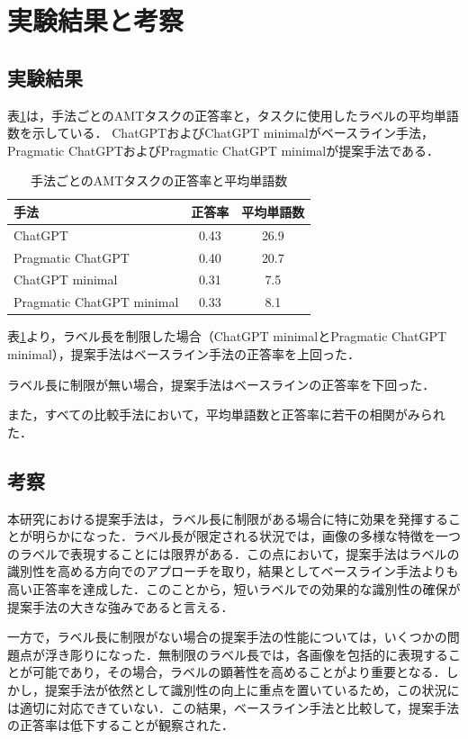 \documentclass[a4paper,11pt]{jreport}
\begin{document}
\section{実験結果と考察}

\subsection{実験結果}

表\ref{tab:accuracy_result}は，手法ごとのAMTタスクの正答率と，タスクに使用したラベルの平均単語数を示している．
ChatGPTおよびChatGPT minimalがベースライン手法，Pragmatic ChatGPTおよびPragmatic ChatGPT minimalが提案手法である．

\begin{table}[H]
\centering
\begin{tabular}{lcc}
\hline
手法 & 正答率 & 平均単語数 \\
\hline
ChatGPT & 0.43 & 26.9 \\
Pragmatic ChatGPT & 0.40 & 20.7 \\
ChatGPT minimal & 0.31 & 7.5 \\
Pragmatic ChatGPT minimal & 0.33 & 8.1 \\
\hline
\end{tabular}
\caption{手法ごとのAMTタスクの正答率と平均単語数}
\label{tab:accuracy_result}
\end{table}

表\ref{tab:accuracy_result}より，ラベル長を制限した場合（ChatGPT minimalとPragmatic ChatGPT minimal），提案手法はベースライン手法の正答率を上回った．

ラベル長に制限が無い場合，提案手法はベースラインの正答率を下回った．

また，すべての比較手法において，平均単語数と正答率に若干の相関がみられた．

\subsection{考察}
本研究における提案手法は，ラベル長に制限がある場合に特に効果を発揮することが明らかになった．ラベル長が限定される状況では，画像の多様な特徴を一つのラベルで表現することには限界がある．この点において，提案手法はラベルの識別性を高める方向でのアプローチを取り，結果としてベースライン手法よりも高い正答率を達成した．このことから，短いラベルでの効果的な識別性の確保が提案手法の大きな強みであると言える．

一方で，ラベル長に制限がない場合の提案手法の性能については，いくつかの問題点が浮き彫りになった．無制限のラベル長では，各画像を包括的に表現することが可能であり，その場合，ラベルの顕著性を高めることがより重要となる．しかし，提案手法が依然として識別性の向上に重点を置いているため，この状況には適切に対応できていない．この結果，ベースライン手法と比較して，提案手法の正答率は低下することが観察された．
\end{document}
